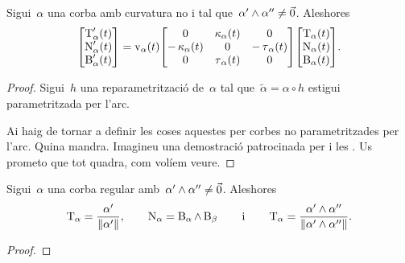 \documentclass[../../main.tex]{subfiles}
\begin{document}
    \begin{theorem}
        \label{thm:fórmules de Frenet}
        Sigui~\(\alpha\) una corba amb curvatura no \nulla{} i tal que~\(\alpha'\mathbin{\wedge}\alpha''\neq\vec{0}\).
        Aleshores
        \[\begin{bmatrix}
            \tangent_{\alpha}'(t) \\
            \normal_{\alpha}'(t) \\
            \binormal_{\alpha}'(t)
        \end{bmatrix}
        =\rapidesa_{\alpha}(t)\begin{bmatrix}
            0 & \curvatura_{\alpha}(t) & 0 \\
            -\curvatura_{\alpha}(t) & 0 & -\torsio_{\alpha}(t) \\
            0 & \torsio_{\alpha}(t) & 0
        \end{bmatrix}
        \begin{bmatrix}
            \tangent_{\alpha}(t) \\
            \normal_{\alpha}(t) \\
            \binormal_{\alpha}(t)
        \end{bmatrix}.\]
        \begin{proof}
            Sigui~\(h\) una reparametrització de~\(\alpha\) tal que~\(\tilde{\alpha}=\alpha\circ h\) estigui parametritzada per l'arc.

            Ai haig de tornar a definir les coses aquestes per corbes no parametritzades per l'arc.
            Quina mandra.
            Imagineu una demostració patrocinada per  i les .
            Us prometo que tot quadra, com volíem veure.
        \end{proof}
    \end{theorem}
    \begin{proposition}
        \label{prop:triedre de frenet d'una corba regular}
        \label{prop:tangent d'una corba regular}
        \label{prop:normal d'una corba regular}
        \label{prop:binormal d'una corba regular}
        Sigui~\(\alpha\) una corba regular amb~\(\alpha'\mathbin{\wedge}\alpha''\neq\vec{0}\).
        Aleshores
        \[
            \tangent_{\alpha}=\frac{\alpha'}{\norm{\alpha'}},\qquad\normal_{\alpha}=\binormal_{\alpha}\prodvec\binormal_{\beta}\qquad\text{i}\qquad\tangent_{\alpha}=\frac{\alpha'\prodvec\alpha''}{\norm{\alpha'\prodvec\alpha''}}.
        \]
        \begin{proof}
        \end{proof}
    \end{proposition}
\end{document}
